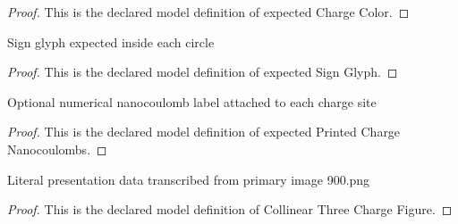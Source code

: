 \begin{proof}
  This is the declared model definition of expected Charge Color.
\end{proof}
\begin{definition}
  \label{def:physics:phyx-mini-0900:phyxminiproblems-problemphyxmini0900-expectedsignglyph}
  Sign glyph expected inside each circle
\end{definition}
\begin{proof}
  This is the declared model definition of expected Sign Glyph.
\end{proof}
\begin{definition}
  \label{def:physics:phyx-mini-0900:phyxminiproblems-problemphyxmini0900-expectedprintedchargenanocoulombs}
  Optional numerical nanocoulomb label attached to each charge site
\end{definition}
\begin{proof}
  This is the declared model definition of expected Printed Charge Nanocoulombs.
\end{proof}
\begin{definition}
  \label{def:physics:phyx-mini-0900:phyxminiproblems-problemphyxmini0900-collinearthreechargefigure}
  Literal presentation data transcribed from primary image 900.png
\end{definition}
\begin{proof}
  This is the declared model definition of Collinear Three Charge Figure.
\end{proof}
